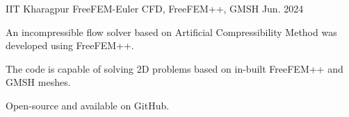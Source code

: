 \begin{cventries}
  \cventry
  {IIT Kharagpur} %
  {FreeFEM-Euler} %
  {CFD, FreeFEM++, GMSH} %
  {Jun. 2024} %
  {
    \begin{cvitems} %
      \item {An incompressible flow solver based on Artificial Compressibility Method was developed using FreeFEM++.}
      \item {The code is capable of solving 2D problems based on in-built FreeFEM++ and GMSH meshes.}
      \item {Open-source and available on GitHub.}
    \end{cvitems}
  }
  
\end{cventries}

